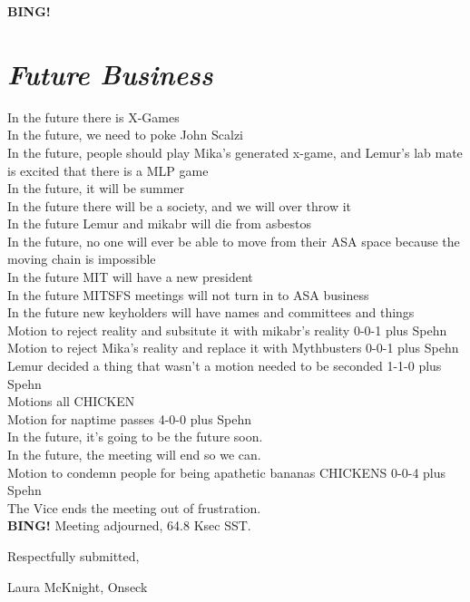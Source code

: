 \documentclass[10pt]{article}
\newcommand{\bing}{{\bf BING!} }
\newcommand{\goto}[1]{\bing \vskip 12pt \section*{{\em{#1}}}}
\newcommand{\ps}{ plus Spehn\xspace}
\newcommand{\onseck}{Laura McKnight, Onseck}
\begin{document}
\goto{Future Business}
In the future there is X-Games\\
In the future, we need to poke John Scalzi\\
In the future, people should play Mika's generated x-game, and Lemur's lab mate is excited that there is a MLP game\\
In the future, it will be summer\\
In the future there will be a society, and we will over throw it\\
In the future Lemur and mikabr will die from asbestos\\
In the future, no one will ever be able to move from their ASA space because the moving chain is impossible\\
In the future MIT will have a new president\\
In the future MITSFS meetings will not turn in to ASA business\\
In the future new keyholders will have names and committees and things\\
Motion to reject reality and subsitute it with mikabr's reality 0-0-1\ps\\
Motion to reject Mika's reality and replace it with Mythbusters 0-0-1\ps\\
Lemur decided a thing that wasn't a motion needed to be seconded 1-1-0\ps\\
Motions all CHICKEN\\
Motion for naptime passes 4-0-0\ps\\
In the future, it's going to be the future soon.\\
In the future, the meeting will end so we can.\\
Motion to condemn people for being apathetic bananas CHICKENS 0-0-4\ps\\
The Vice ends the meeting out of frustration.\\
\bing
\noindent
Meeting adjourned, 64.8 Ksec SST.

\vspace{18pt}

\centerline{Respectfully submitted,}
\centerline{\onseck}
\end{document}
